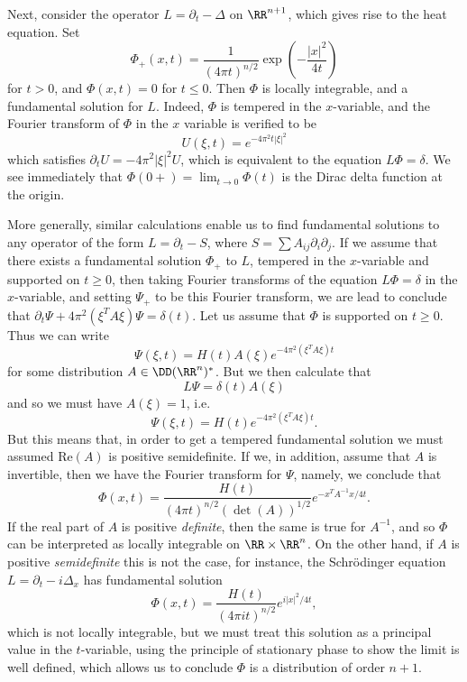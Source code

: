 \begin{example}
    Next, consider the operator $L = \partial_t - \Delta$ on $\RR^{n+1}$, which gives rise to the heat equation. Set
    \[ \Phi_+(x,t) = \frac{1}{(4 \pi t)^{n/2}} \exp \left( - \frac{|x|^2}{4t} \right) \]
    for $t > 0$, and $\Phi(x,t) = 0$ for $t \leq 0$. Then $\Phi$ is locally integrable, and a fundamental solution for $L$. Indeed, $\Phi$ is tempered in the $x$-variable, and the Fourier transform of $\Phi$ in the $x$ variable is verified to be
    \[ U(\xi,t) = e^{- 4 \pi^2 t |\xi|^2} \]
    which satisfies $\partial_t U = - 4 \pi^2 |\xi|^2 U$, which is equivalent to the equation $L \Phi = \delta$. We see immediately that $\Phi(0+) = \lim_{t \to 0} \Phi(t)$ is the Dirac delta function at the origin.

    More generally, similar calculations enable us to find fundamental solutions to any operator of the form $L = \partial_t - S$, where $S = \sum A_{ij} \partial_i \partial_j$. If we assume that there exists a fundamental solution $\Phi_+$ to $L$, tempered in the $x$-variable and supported on $t \geq 0$, then taking Fourier transforms of the equation $L\Phi = \delta$ in the $x$-variable, and setting $\Psi_+$ to be this Fourier transform, we are lead to conclude that $\partial_t \Psi + 4\pi^2 (\xi^T A \xi) \Psi = \delta(t)$. Let us assume that $\Phi$ is supported on $t \geq 0$. Thus we can write
    \[ \Psi(\xi,t) = H(t) A(\xi) e^{- 4 \pi^2 (\xi^T A \xi) t} \]
    for some distribution $A \in \DD(\RR^n)^*$. But we then calculate that
    \[ L \Psi = \delta(t) A(\xi) \]
    and so we must have $A(\xi) = 1$, i.e.
    \[ \Psi(\xi,t) = H(t) e^{-4 \pi^2 (\xi^T A \xi) t}. \]
    But this means that, in order to get a tempered fundamental solution we must assumed $\text{Re}(A)$ is positive semidefinite. If we, in addition, assume that $A$ is invertible, then we have the Fourier transform for $\Psi$, namely, we conclude that
    \[ \Phi(x,t) = \frac{H(t)}{(4 \pi t)^{n/2} ( \det(A))^{1/2}} e^{- x^T A^{-1} x / 4t}. \]
    If the real part of $A$ is positive \emph{definite}, then the same is true for $A^{-1}$, and so $\Phi$ can be interpreted as locally integrable on $\RR \times \RR^n$. On the other hand, if $A$ is positive \emph{semidefinite} this is not the case, for instance, the Schr\"{o}dinger equation $L = \partial_t - i \Delta_x$ has fundamental solution
    \[ \Phi(x,t) = \frac{H(t)}{(4 \pi i t)^{n/2}} e^{i |x|^2 / 4t},  \]
    which is not locally integrable, but we must treat this solution as a principal value in the $t$-variable, using the principle of stationary phase to show the limit is well defined, which allows us to conclude $\Phi$ is a distribution of order $n+1$.
\end{example}


